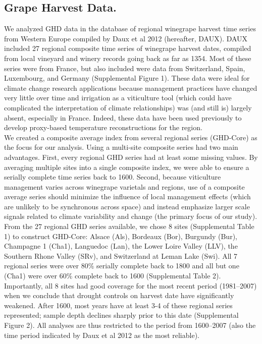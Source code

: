 \documentclass[final]{nature}
\begin{document}
\begin{methods}
\subsection{Grape Harvest Data.}
\noindent We analyzed GHD data in the database of regional winegrape harvest time series from Western Europe compiled by Daux et al 2012 (hereafter, DAUX\cite{Daux2012}). DAUX included 27 regional composite time series of winegrape harvest dates, compiled from local vineyard and winery records going back as far as 1354. Most of these series were from France, but also included were data from Switzerland, Spain, Luxembourg, and Germany (Supplemental Figure 1). These data were ideal for climate change research applications because management practices have changed very little over time and irrigation as a viticulture tool (which could have complicated the interpretation of climate relationships) was (and still is) largely absent, especially in France. Indeed, these data have been used previously to develop proxy-based temperature reconstructions for the region\cite{Daux2012}.\\
\indent We created a composite average index from several regional series (GHD-Core) as the focus for our analysis. Using a multi-site composite series had two main advantages. First, every regional GHD series had at least some missing values. By averaging multiple sites into a single composite index, we were able to ensure a serially complete time series back to 1600. Second, because viticulture management varies across winegrape varietals and regions, use of a composite average series should minimize the influence of local management effects (which are unlikely to be synchronous across space) and instead emphasize larger scale signals related to climate variability and change (the primary focus of our study).\\
\indent From the 27 regional GHD series available, we chose 8 sites (Supplemental Table 1) to construct GHD-Core: Alsace (Als), Bordeaux (Bor), Burgundy (Bur), Champagne 1 (Cha1), Languedoc (Lan), the Lower Loire Valley (LLV), the Southern Rhone Valley (SRv), and Switzerland at Leman Lake (Swi). All 7 regional series were over 80\% serially complete back to 1800 and all but one (Cha1) were over 60\% complete back to 1600 (Supplemental Table 2). Importantly, all 8 sites had good coverage for the most recent period (1981--2007) when we conclude that drought controls on harvest date have significantly weakened. After 1600, most years have at least 3-4 of these regional series represented; sample depth declines sharply prior to this date (Supplemental Figure 2). All analyses are thus restricted to the period from 1600--2007 (also the time period indicated by Daux et al 2012 as the most reliable).\\

\end{methods}
\end{document}
